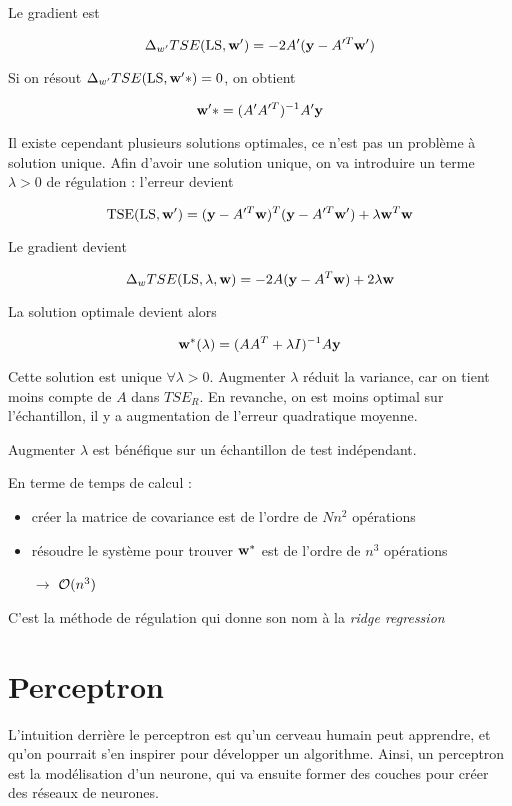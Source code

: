 	Le gradient est
		
	$$\Delta_{w'} TSE(\text{LS}, \textbf{w}') = -2 A' (\textbf{y} - A'^T\textbf{w}')$$
		
	Si on résout $\Delta_{w'} TSE(\text{LS}, \textbf{w}'*) = 0$, on obtient
		
	$$\textbf{w}'* = (A'A'^T)^{-1}A'\textbf{y}$$
		
	Il existe cependant plusieurs solutions optimales, ce n'est pas un problème à solution unique. Afin d'avoir une solution unique, on va introduire un terme $\lambda > 0$ de régulation : l'erreur devient
	
	$$\text{TSE}(\text{LS}, \textbf{w}') = (\textbf{y} - A'^T\textbf{w})^T(\textbf{y} - A'^T\textbf{w}') + \lambda \textbf{w}^T\textbf{w}$$
	
	Le gradient devient
	
	$$\Delta_{w} TSE(\text{LS}, \lambda, \textbf{w}) = -2 A (\textbf{y} - A^T\textbf{w}) + 2 \lambda \textbf{w}$$
	
	La solution optimale devient alors
	
	$$\textbf{w}^*(\lambda) = (A A^T + \lambda I)^{-1} A \textbf{y}$$
	
	Cette solution est unique $\forall \lambda > 0$. Augmenter $\lambda$ réduit la variance, car on tient moins compte de $A$ dans $TSE_R$. En revanche, on est moins optimal sur l'échantillon, il y a augmentation de l'erreur quadratique moyenne.
		
		
	Augmenter $\lambda$ est bénéfique sur un échantillon de test indépendant.
	
	En terme de temps de calcul :
	
	\begin{itemize}
		\item créer la matrice de covariance est de l'ordre de $N n^2$ opérations
		\item résoudre le système pour trouver $\textbf{w}^*$ est de l'ordre de $n^3$ opérations
		\item[$\rightarrow$] $\mathcal{O}(n^3)$
	\end{itemize}
	
	
	C'est la méthode de régulation qui donne son nom à la \textit{ridge regression}
	
	
\section{Perceptron}
	
L'intuition derrière le perceptron est qu'un cerveau humain peut apprendre, et qu'on pourrait s'en inspirer pour développer un algorithme. Ainsi, un perceptron est la modélisation d'un neurone, qui va ensuite former des couches pour créer des réseaux de neurones.
	
